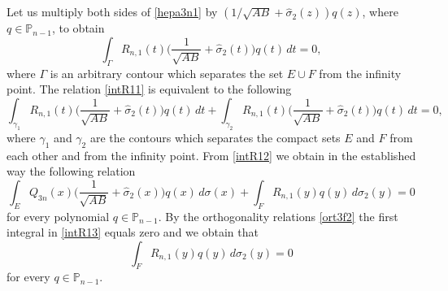 \documentclass[11pt, a4paper, twoside]{article}
\let\myh\widehat
\def\PP{\mathbb P}
\theoremstyle{plain}
\theoremstyle{definition}
\begin{document}
\subsection{}\label{s4s2}
Let us multiply both sides of \eqref{hepa3n1} by $(1/\sqrt{AB}+\myh{\sigma}_2(z))q(z)$, where $q\in\PP_{n-1}$, to obtain
\begin{equation}
\int_\Gamma R_{n,1}(t)\biggl(\frac1{\sqrt{AB}}+\myh{\sigma}_2(t)\biggr)q(t)\,dt=0,
\label{intR11}
\end{equation}
where $\Gamma$ is an arbitrary contour which separates the set $E\cup F$ from the infinity point.
The relation \eqref{intR11} is equivalent to the following
\begin{equation}
\int_{\gamma_1}R_{n,1}(t)\biggl(\frac1{\sqrt{AB}}+\myh{\sigma}_2(t)\biggr)q(t)\,dt+
\int_{\gamma_2} R_{n,1}(t)\biggl(\frac1{\sqrt{AB}}+\myh{\sigma}_2(t)\biggr)q(t)\,dt=0,
\label{intR12}
\end{equation}
where $\gamma_1$ and $\gamma_2$  are the contours which separates the compact sets $E$ and $F$ from each other and from the infinity point. From \eqref{intR12} we obtain in the established way the following relation
\begin{equation}
\int_E Q_{3n}(x)\biggl(\frac1 {\sqrt{AB}}+\myh{\sigma}_2(x)\biggr)q(x)\,d\sigma(x)
+\int_F R_{n,1}(y)q(y)\,d\sigma_2(y)=0
\label{intR13}
\end{equation}
for every polynomial $q\in\PP_{n-1}$. By the orthogonality relations \eqref{ort3f2} the first integral in \eqref{intR13} equals zero and we obtain that
\begin{equation}
\int_F R_{n,1}(y)q(y)\,d\sigma_2(y)=0
\label{intR14}
\end{equation}
for every $q\in\PP_{n-1}$.
\end{document}
